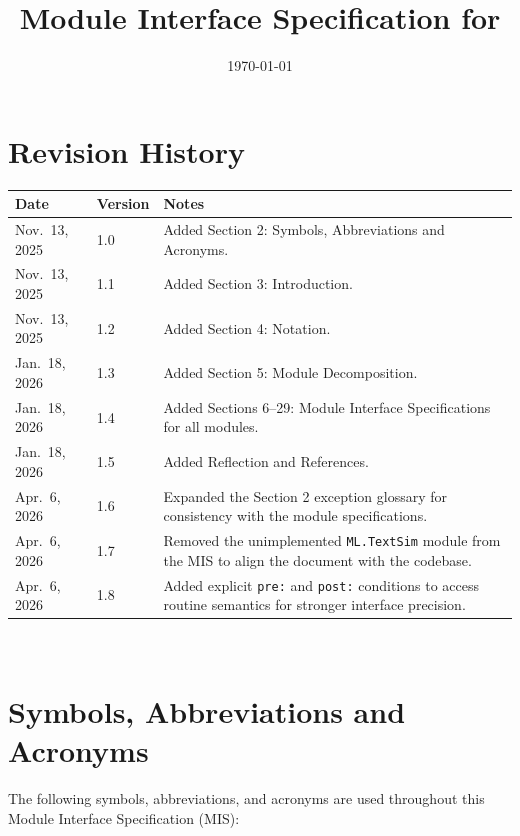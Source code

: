 \documentclass[12pt, titlepage]{article}
\begin{document}
\title{Module Interface Specification for \progname{}}

\author{\authname}

\date{\today}

\maketitle


\section{Revision History}

\begin{tabularx}{\textwidth}{p{3cm}p{2cm}X}
\toprule {\bf Date} & {\bf Version} & {\bf Notes}\\
\midrule

Nov.\ 13, 2025 & 1.0 & Added Section 2: Symbols, Abbreviations and Acronyms.\\
Nov.\ 13, 2025 & 1.1 & Added Section 3: Introduction.\\
Nov.\ 13, 2025 & 1.2 & Added Section 4: Notation.\\
Jan.\ 18, 2026 & 1.3 & Added Section 5: Module Decomposition.\\
Jan.\ 18, 2026 & 1.4 & Added Sections 6--29: Module Interface Specifications for all modules.\\
Jan.\ 18, 2026 & 1.5 & Added Reflection and References.\\
Apr.\ 6, 2026 & 1.6 & Expanded the Section 2 exception glossary for consistency with the module specifications.\\
Apr.\ 6, 2026 & 1.7 & Removed the unimplemented \texttt{ML.TextSim} module from the MIS to align the document with the codebase.\\
Apr.\ 6, 2026 & 1.8 & Added explicit \texttt{pre:} and \texttt{post:} conditions to access routine semantics for stronger interface precision.\\

\bottomrule
\end{tabularx}

~\newpage

\section{Symbols, Abbreviations and Acronyms}

The following symbols, abbreviations, and acronyms are used throughout this Module Interface Specification (MIS):
\end{document}
